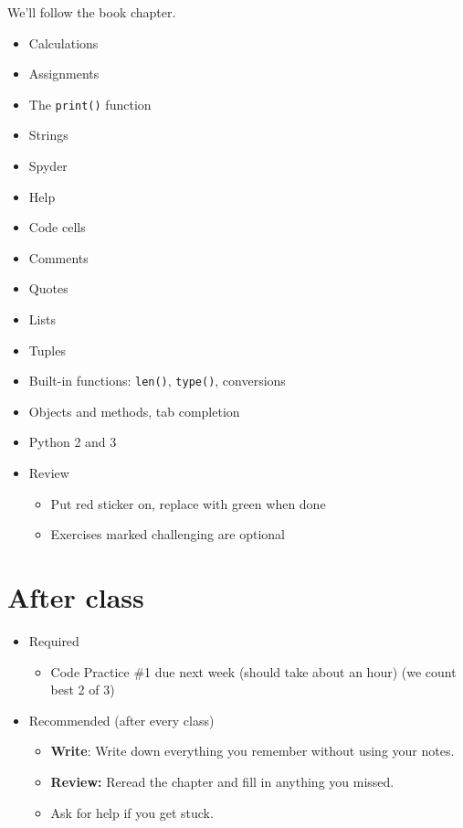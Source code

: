 \documentclass[11pt]{article}
\begin{document}
We'll follow the book chapter.
\begin{itemize}
\item Calculations %
\item Assignments
\item The {\tt print()} function
\item Strings
\item Spyder
\item Help
\item Code cells
\item Comments
\item Quotes
\item Lists
\item Tuples
\item Built-in functions:  {\tt len()}, {\tt type()}, conversions
\item Objects and methods, tab completion
\item Python 2 and 3
\item Review
\begin{itemize}
\item Put red sticker on, replace with green when done
\item Exercises marked challenging are optional
\end{itemize}
\end{itemize}

\section*{After class}

\begin{itemize}
\item Required
\begin{itemize}
\item Code Practice \#1 due next week (should take about an hour) (we count best 2 of 3)
\end{itemize}
\item Recommended (after every class)
\begin{itemize}
\item {\bf Write}:  Write down everything you remember without using your notes.
\item {\bf Review:} Reread the chapter and fill in anything you missed.
\item Ask for help if you get stuck.
\end{itemize}
\end{itemize}


\end{document}
